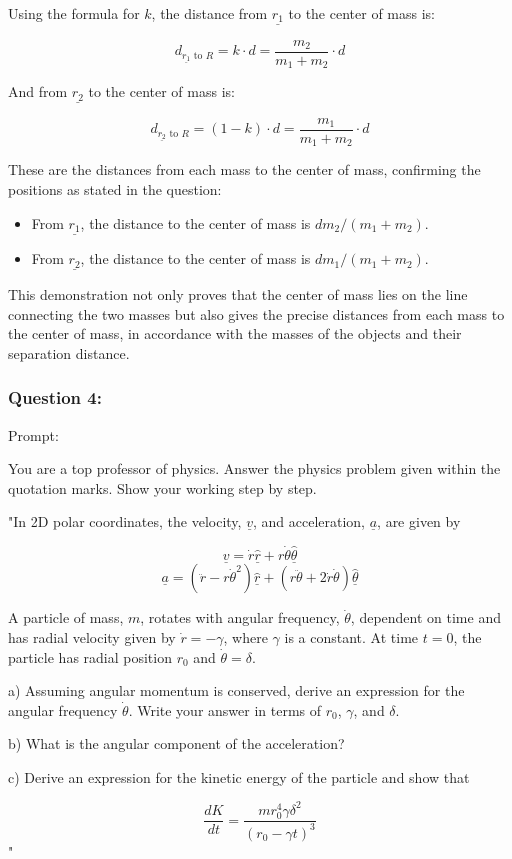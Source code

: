 \documentclass[a4paper,11pt]{article}
\begin{document}
Using the formula for \( k \), the distance from \( \underline{r_{1}} \) to the center of mass is:

\[ d_{\underline{r_{1}}\text{ to }R} = k \cdot d = \frac{m_{2}}{m_{1} + m_{2}} \cdot d \]

And from \( \underline{r_{2}} \) to the center of mass is:

\[ d_{\underline{r_{2}}\text{ to }R} = (1 - k) \cdot d = \frac{m_{1}}{m_{1} + m_{2}} \cdot d \]

These are the distances from each mass to the center of mass, confirming the positions as stated in the question:

\begin{itemize}
    \item From \( \underline{r_{1}} \), the distance to the center of mass is \( d m_{2}/(m_{1}+m_{2}) \).
    \item From \( \underline{r_{2}} \), the distance to the center of mass is \( d m_{1}/(m_{1}+m_{2}) \).
\end{itemize}

This demonstration not only proves that the center of mass lies on the line connecting the two masses but also gives the precise distances from each mass to the center of mass, in accordance with the masses of the objects and their separation distance.

\subsubsection*{Question 4:}

Prompt:
\begin{spverbatim}
    You are a top professor of physics. Answer the physics problem given within the quotation marks. Show your working step by step.

    "In 2D polar coordinates, the velocity, \( \underline{v} \), and acceleration, \( \underline{a} \), are given by 

    \[ 
    \underline{v} = \dot{r} \underline{\hat{r}} + r \dot{\theta} \underline{\hat{\theta}} 
    \]
    \[ 
    \underline{a} = (\ddot{r} - r \dot{\theta}^{2}) \underline{\hat{r}} + (r \ddot{\theta} + 2\dot{r}\dot{\theta} ) \underline{\hat{\theta}} 
    \]
    
    A particle of mass, \( m \), rotates with angular frequency, \( \dot{\theta} \), dependent on time and has radial velocity given by \( \dot{r} = - \gamma \), where \( \gamma \) is a constant. At time \( t = 0 \), the particle has radial position \( r_{0} \) and \( \dot{\theta} = \delta \). 
    
    a) Assuming angular momentum is conserved, derive an expression for the angular frequency \( \dot{\theta} \). Write your answer in terms of \( r_{0} \), \( \gamma \), and \( \delta \).
    
    b) What is the angular component of the acceleration?
    
    c) Derive an expression for the kinetic energy of the particle and show that 
    
    \[
    \frac{dK}{dt} = \frac{m r_{0}^{4} \gamma \delta^{2}}{(r_{0} - \gamma t)^{3}}
    \]"
\end{spverbatim}
\end{document}
